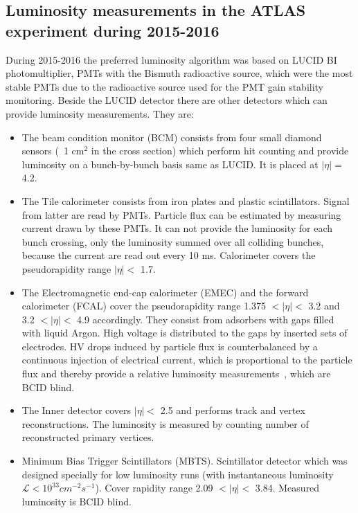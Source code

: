 \subsection{Luminosity measurements in the ATLAS experiment during 2015-2016}
\label{subsec:lumi_2015_2016}
During 2015-2016 the preferred luminosity algorithm was based on LUCID BI photomultiplier, PMTs with the Bismuth radioactive source, which were the most stable PMTs due to the radioactive source used for the PMT gain stability monitoring.
Beside the LUCID detector there are other detectors which can provide luminosity measurements. They are: 

\begin{itemize}
 \item The beam condition monitor (BCM) consists from four small diamond sensors (~1 cm$^2$ in the cross section) which perform hit counting and provide luminosity on a bunch-by-bunch basis same as LUCID. It is placed at $|\eta| = $ 4.2.
 \item The Tile calorimeter consists from iron plates and plastic scintillators. 
 Signal from latter are read by PMTs. Particle flux can be estimated by measuring current drawn by these PMTs. 
 It can not provide the luminosity for each bunch crossing, only the luminosity summed over all colliding bunches, because the current are read out every 10 ms. Calorimeter covers the pseudorapidity range $|\eta| < $ 1.7.
 \item The Electromagnetic end-cap calorimeter (EMEC) and the forward calorimeter (FCAL) cover the pseudorapidity range 1.375 $< |\eta| < $ 3.2 and 3.2 $< |\eta| < $ 4.9 accordingly. 
 They consist from adsorbers with gaps filled with liquid Argon. High voltage is distributed to the gaps by inserted sets of electrodes.
 HV drops induced by particle flux is counterbalanced by a continuous injection of electrical current, which is proportional to the particle flux and thereby provide a 
 relative luminosity measurements~\cite{Aaboud:2016hhf}, which are BCID blind. 
 \item The Inner detector covers $|\eta| < $ 2.5 and performs track and vertex reconstructions. 
 The luminosity is measured by counting number of reconstructed primary vertices.
 \item Minimum Bias Trigger Scintillators (MBTS). Scintillator detector which was designed specially 
 for low luminosity runs (with instantaneous luminosity $\mathscr{L} < 10^{33} cm^{-2}s^{-1}$). 
 Cover rapidity range 2.09 $< |\eta| < $ 3.84. Measured luminosity is BCID blind.
\end{itemize}

